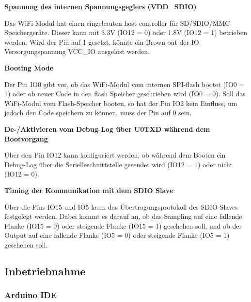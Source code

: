 \newpage

\textbf{Spannung des internen Spannungsgeglers (VDD\_SDIO)}

Das WiFi-Modul hat einen eingebauten host controller für SD/SDIO/MMC-Speichergeräte. Dieser kann mit 3.3V (IO12 = 0) oder 1.8V (IO12 = 1) betrieben werden. Wird der Pin auf 1 gesetzt, könnte ein Brown-out der IO-Versorgungspannung VCC\_IO ausgelöst werden.

\textbf{Booting Mode}

Der Pin IO0 gibt vor, ob das WiFi-Modul vom internen SPI-flash bootet (IO0 = 1) oder ob neuer Code in den flash Speicher geschrieben wird (IO0 = 0). Soll das WiFi-Modul vom Flash-Speicher booten, so hat der Pin IO2 kein Einfluss, um jedoch den Code speichern zu können, muss der Pin auf 0 sein.

\textbf{De-/Aktivieren vom Debug-Log über U0TXD während dem Bootvorgang}

Über den Pin IO12 kann konfiguriert werden, ob während dem Booten ein Debug-Log über die Serielleschnittstelle gesendet wird (IO12 = 1) oder nicht (IO12 = 0).

\textbf{Timing der Kommunikation mit dem SDIO Slave}:

Über die Pins IO15 und IO5 kann das Übertragungsprotokoll des SDIO-Slaves festgelegt werden. Dabei kommt es darauf an, ob das Sampling auf eine fallende Flanke (IO15 = 0) oder steigende Flanke (IO15 = 1) geschehen soll, und ob der Output auf eine fallende Flanke (IO5 = 0) oder steigende Flanke (IO5 = 1) geschehen soll.

\cite{espressif_systems_esp32_2020} \cite{various_contributors_espressifesptool_2020}


\subsection{Inbetriebnahme}

\subsubsection{Arduino IDE}\label{Appendix:ESP32_Arduino_IDE}

